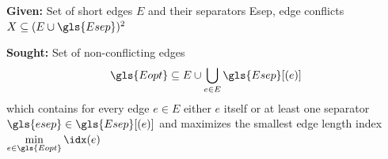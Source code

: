 %   
%   
% 
%   
% 
% 
% 


\begin{problem}
  \hfill
  \begin{labeling}{\hspace{4em}}
    \item[\textbf{Given:}]
      Set of short edges \(E\) and their separators \gls{Esep},
      edge conflicts \(X \subseteq (E \cup \gls{Esep})^2\)
    \item[\textbf{Sought:}]
      Set of non-conflicting edges
      \[
        \gls{Eopt} \subseteq E
        \cup \bigcup\limits_{e \in E} \gls{Esep}[(e)]
      \]
      which contains for every edge \(e \in E\) either \(e\) itself
      or at least one separator \(\gls{esep} \in \gls{Esep}[(e)]\)
      and maximizes the smallest edge length index
      \(\min\limits_{e \in \gls{Eopt}} \idx(e)\)
  \end{labeling}
\end{problem}

